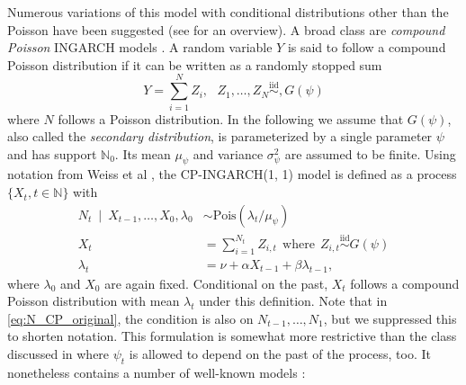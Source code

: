\documentclass[review]{elsarticle}
\begin{document}
Numerous variations of this model with conditional distributions other than the Poisson have been suggested (see \cite{Weiss2018} for an overview). A broad class are \textit{compound Poisson} INGARCH models \cite{Goncalves2015, Silva2016}. A random variable $Y$ is said to follow a compound Poisson distribution \cite[Chapter 3]{Feller1968} if it can be written as a randomly stopped sum 
$$
Y = \sum_{i = 1}^N Z_i, \ \ \ Z_1, \dots, Z_N \stackrel{\text{iid}}{\sim}, G(\psi)
$$
where $N$ follows a Poisson distribution. In the following we assume that $G(\psi)$, also called the \textit{secondary distribution}, is parameterized by a single parameter $\psi$ and has support $\mathbb{N}_0$. Its mean $\mu_\psi$ and variance $\sigma^2_\psi$ are assumed to be finite. Using notation from Weiss et al \cite[Sec. 2]{Weiss2017}, the CP-INGARCH(1, 1) model is defined as a process $\{X_t, t \in \mathbb{N}\}$ with %
\begin{align}
N_t \ \mid \ X_{t - 1}, \dots, X_0, \lambda_0 & \sim \text{Pois}(\lambda_t/\mu_\psi) \label{eq:N_CP_original}\\
X_t & = \sum_{i = 1}^{N_t} Z_{i, t} \ \ \text{where} \ \  Z_{i, t} \stackrel{\text{iid}}{\sim} G(\psi)\label{eq:X_CP_original}\\
\lambda_t & = \nu + \alpha X_{t - 1} + \beta \lambda_{t - 1},\label{eq:lambda_CP_original}
\end{align}
where $\lambda_0$ and $X_0$ are again fixed. Conditional on the past, $X_t$ follows a compound Poisson distribution with mean $\lambda_t$ under this definition. Note that in \eqref{eq:N_CP_original}, the condition is also on $N_{t - 1}, \dots, N_1$, but we suppressed this to shorten notation. This formulation is somewhat more restrictive than the class discussed in \citep{Goncalves2015} where $\psi_t$ is allowed to depend on the past of the process, too. It nonetheless contains a number of well-known models \cite[Observation 2]{Goncalves2015}:
\end{document}
